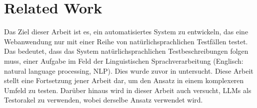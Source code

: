 
\chapter{Related Work}
\label{ch:FirstContent}

Das Ziel dieser Arbeit ist es, ein automatisiertes System zu entwickeln, das eine Webanwendung nur mit einer Reihe von natürlichsprachlichen Testfällen testet.
Das bedeutet, dass das System natürlichsprachlichen Testbeschreibungen folgen muss, einer Aufgabe im Feld der Linguistischen Sprachverarbeitung (Englisch: natural language processing, NLP).
Dies wurde zuvor in \cite{GPT3Testing} untersucht.
Diese Arbeit stellt eine Fortsetzung jener Arbeit dar, um den Ansatz in einem komplexeren Umfeld zu testen.
Darüber hinaus wird in dieser Arbeit auch versucht, LLMs als Testorakel zu verwenden, wobei derselbe Ansatz verwendet wird.

